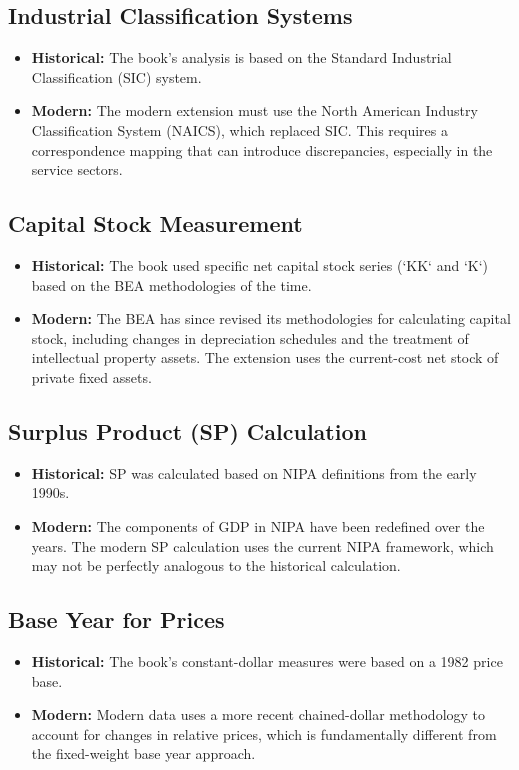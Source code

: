 \documentclass[12pt,a4paper]{article}
\begin{document}
\subsection{Industrial Classification Systems}
\begin{itemize}
    \item \textbf{Historical:} The book's analysis is based on the Standard Industrial Classification (SIC) system.
    \item \textbf{Modern:} The modern extension must use the North American Industry Classification System (NAICS), which replaced SIC. This requires a correspondence mapping that can introduce discrepancies, especially in the service sectors.
\end{itemize}

\subsection{Capital Stock Measurement}
\begin{itemize}
    \item \textbf{Historical:} The book used specific net capital stock series (`KK` and `K`) based on the BEA methodologies of the time.
    \item \textbf{Modern:} The BEA has since revised its methodologies for calculating capital stock, including changes in depreciation schedules and the treatment of intellectual property assets. The extension uses the current-cost net stock of private fixed assets.
\end{itemize}

\subsection{Surplus Product (SP) Calculation}
\begin{itemize}
    \item \textbf{Historical:} SP was calculated based on NIPA definitions from the early 1990s.
    \item \textbf{Modern:} The components of GDP in NIPA have been redefined over the years. The modern SP calculation uses the current NIPA framework, which may not be perfectly analogous to the historical calculation.
\end{itemize}

\subsection{Base Year for Prices}
\begin{itemize}
    \item \textbf{Historical:} The book's constant-dollar measures were based on a 1982 price base.
    \item \textbf{Modern:} Modern data uses a more recent chained-dollar methodology to account for changes in relative prices, which is fundamentally different from the fixed-weight base year approach.
\end{itemize}
\end{document}
